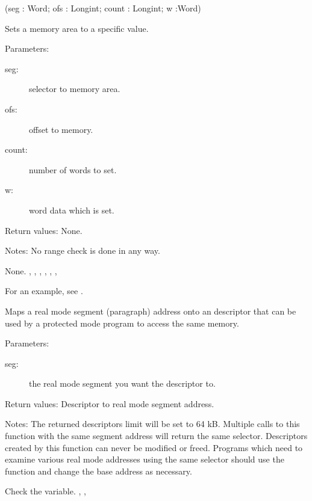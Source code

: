 \html{}

{(seg : Word; ofs : Longint; count : Longint; w :Word)}
{
Sets a memory area to a specific value.

Parameters:
\begin{description}
\item[seg:\ ] selector to memory area.
\item[ofs:\ ] offset to memory.
\item[count:\ ] number of words to set.
\item[w:\ ] word data which is set.
\end{description}

Return values: None.

Notes: No range check is done in any way.
}{None. }
{ 
,
, 
, 
,
,
,
 }

For an example, see 
.

{
Maps a real mode segment (paragraph) address onto an descriptor that can be
used by a protected mode program to access the same memory.

Parameters: 
\begin{description}
\item [seg:\ ] the real mode segment you want the descriptor to.
\end{description}

Return values: Descriptor to real mode segment address.

Notes: The returned descriptors limit will be set to 64 kB. Multiple calls
to this function with the same segment address will return the same
selector. Descriptors created by this function can never be modified or
freed. Programs which need to examine various real mode addresses using the
same selector should use the function 
 and change
the base address as necessary.
}{ Check the  variable. }
{,
,
}

